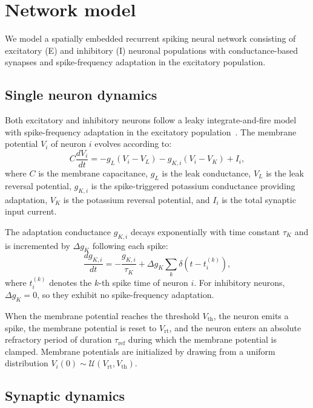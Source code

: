 \documentclass[%
	preprint, %
	amsmath,
	amssymb,
	aps,
	prx,
	floatfix,
	11pt %
]{revtex4-2}
\begin{document}
\section{Network model}


We model a spatially embedded recurrent spiking neural network consisting of excitatory (E) and inhibitory (I) neuronal populations with conductance-based synapses and spike-frequency adaptation in the excitatory population.


\subsection{Single neuron dynamics}

Both excitatory and inhibitory neurons follow a leaky integrate-and-fire model with spike-frequency adaptation in the excitatory population~\cite{Treves1993}. The membrane potential $V_i$ of neuron $i$ evolves according to:
\begin{equation}
    C \frac{dV_i}{dt} = -g_L(V_i - V_L) - g_{K,i}(V_i - V_K) + I_{i},
\end{equation}
where $C$ is the membrane capacitance, $g_L$ is the leak conductance, $V_L$ is the leak reversal potential, $g_{K,i}$ is the spike-triggered potassium conductance providing adaptation, $V_K$ is the potassium reversal potential, and $I_{i}$ is the total synaptic input current.

The adaptation conductance $g_{K,i}$ decays exponentially with time constant $\tau_K$ and is incremented by $\Delta g_K$ following each spike:
\begin{equation}
    \frac{dg_{K,i}}{dt} = -\frac{g_{K,i}}{\tau_K} + \Delta g_K \sum_k \delta(t - t_i^{(k)}),
\end{equation}
where $t_i^{(k)}$ denotes the $k$-th spike time of neuron $i$. For inhibitory neurons, $\Delta g_K = 0$, so they exhibit no spike-frequency adaptation.

When the membrane potential reaches the threshold $V_{\mathrm{th}}$, the neuron emits a spike, the membrane potential is reset to $V_{\mathrm{rt}}$, and the neuron enters an absolute refractory period of duration $\tau_{\mathrm{ref}}$ during which the membrane potential is clamped. Membrane potentials are initialized by drawing from a uniform distribution $V_i(0) \sim \mathcal{U}(V_{\mathrm{rt}}, V_{\mathrm{th}})$.

\subsection{Synaptic dynamics}
\end{document}
